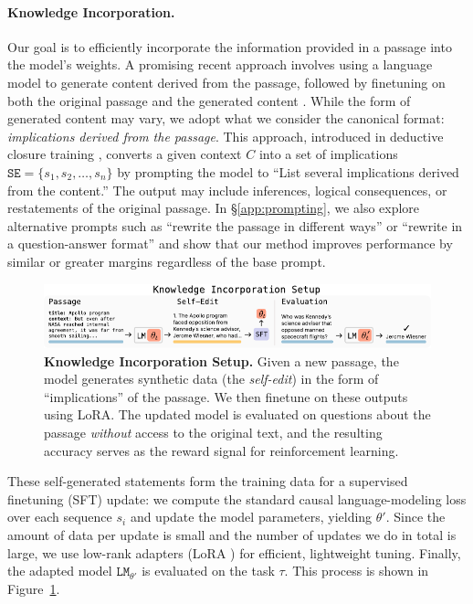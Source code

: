 \documentclass{article}
\begin{document}
\paragraph{Knowledge Incorporation.} 
Our goal is to efficiently incorporate the information provided in a passage into the model's weights. A promising recent approach involves using a language model to generate content derived from the passage, followed by finetuning on both the original passage and the generated content \citep{yehudai2024genie, akyurek2024deductive,yang2025synthetic,lampinen2025generalizationlanguagemodelsincontext,park2025textitnewnewssystem2finetuning}. While the form of generated content may vary, we adopt what we consider the canonical format: \textit{implications derived from the passage}. This approach, introduced in deductive closure training \citep{akyurek2024deductive}, converts a given context $C$ into a set of implications $\texttt{SE} = \{s_1, s_2, \dots, s_n\}$ by prompting the model to ``List several implications derived from the content.'' The output may include inferences, logical consequences, or restatements of the original passage. In \S\ref{app:prompting}, we also explore alternative prompts such as ``rewrite the passage in different ways'' or ``rewrite in a question-answer format'' and show that our method improves performance by similar or greater margins regardless of the base prompt.

\begin{figure}[ht]
    \includegraphics[width=1\linewidth]{figures/knowledge_setup.pdf}
    \caption{\textbf{Knowledge Incorporation Setup.} Given a new passage, the model generates synthetic data (the \textit{self-edit}) in the form of ``implications'' of the passage. We then finetune on these outputs using LoRA. The updated model is evaluated on questions about the passage \textit{without} access to the original text, and the resulting accuracy serves as the reward signal for reinforcement learning.}
    \label{fig:cpt_inner_loop}
\end{figure}

These self-generated statements form the training data for a supervised finetuning (SFT) update: we compute the standard causal language-modeling loss over each sequence $s_i$ and update the model parameters, yielding $\theta'$. Since the amount of data per update is small and the number of updates we do in total is large, we use low-rank adapters (LoRA \citep{hu2022lora}) for efficient, lightweight tuning. Finally, the adapted model $\texttt{LM}_{\theta'}$ is evaluated on the task $\tau$. This process is shown in Figure~\ref{fig:cpt_inner_loop}.
\end{document}
